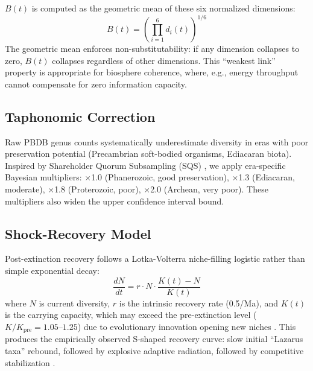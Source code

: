 \documentclass[10pt,letterpaper]{article}
\newcommand{\bt}{$B(t)$}
\begin{document}
\bt{} is computed as the geometric mean of these six normalized dimensions:
\begin{equation}
B(t) = \left(\prod_{i=1}^{6} d_i(t)\right)^{1/6}
\end{equation}
The geometric mean enforces non-substitutability: if any dimension collapses
to zero, \bt{} collapses regardless of other dimensions. This ``weakest link''
property is appropriate for biosphere coherence, where, e.g., energy throughput
cannot compensate for zero information capacity.

\subsection*{Taphonomic Correction}

Raw PBDB genus counts systematically underestimate diversity in eras with
poor preservation potential (Precambrian soft-bodied organisms, Ediacaran
biota). Inspired by Shareholder Quorum Subsampling (SQS) \cite{alroy2010},
we apply era-specific Bayesian multipliers: $\times$1.0 (Phanerozoic, good
preservation), $\times$1.3 (Ediacaran, moderate), $\times$1.8 (Proterozoic,
poor), $\times$2.0 (Archean, very poor). These multipliers also widen the
upper confidence interval bound.

\subsection*{Shock-Recovery Model}

Post-extinction recovery follows a Lotka-Volterra niche-filling logistic
rather than simple exponential decay:
\begin{equation}
\frac{dN}{dt} = r \cdot N \cdot \frac{K(t) - N}{K(t)}
\end{equation}
where $N$ is current diversity, $r$ is the intrinsic recovery rate (0.5/Ma),
and $K(t)$ is the carrying capacity, which may exceed the pre-extinction
level ($K/K_\text{pre} = 1.05$--$1.25$) due to evolutionary innovation opening
new niches \cite{erwin2001}. This produces the empirically observed S-shaped
recovery curve: slow initial ``Lazarus taxa'' rebound, followed by explosive
adaptive radiation, followed by competitive stabilization
\cite{sahney2008}.
\end{document}
